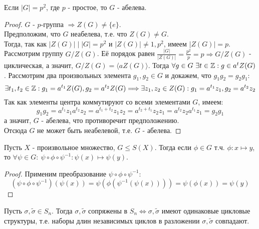 \begin{consequense}
    Если $|G| = p^2$, где $p$ - простое, то $G$ - абелева.
\end{consequense}
\begin{proof}
    $G$ - $p$-группа $\Longrightarrow Z(G) \neq \{e\}$.\\
    Предположим, что $G$ неабелева, т.е. что $Z(G) \neq G$. \\
    Тогда, так как $|Z(G)| \mid |G| = p^2$ и $|Z(G)| \neq 1, p^2$, имеем $|Z(G)| = p$.\\
    Рассмотрим группу $G / Z(G)$. Её порядок равен $\frac{|G|}{|Z(G)|} = \frac{p^2}{p} = p \Longrightarrow G / Z(G)$ - циклическая, а значит, $G / Z(G) = \langle aZ(G) \rangle$. Тогда $\forall g \in G \ \exists t \in \mathbb{Z}: g \in a^tZ(G)$. Рассмотрим два произвольных элемента $g_1, g_2 \in G$ и докажем, что $g_1g_2 = g_2g_1$:
    \[\exists t_1, t_2 \in \mathbb{Z}: g_1 = a^{t_1}Z(G), g_2 = a^{t_2}Z(G) \Longrightarrow \exists z_1, z_2 \in Z(G):  g_1 = a^{t_1}z_1, g_2 = a^{t_2}z_2\]
    Так как элементы центра коммутируют со всеми элементами $G$, имеем:
    \[g_1g_2 = a^{t_1}z_1a^{t_2}z_2 = a^{t_1 + t_2}z_1z_2 = a^{t_2 + t_1}z_2z_1 = a^{t_2}z_2a^{t_1}z_1 = g_2g_1\]
    а значит, $G$ - абелева, что противоречит предположению.\\
    Отсюда $G$ не может быть неабелевой, т.е. $G$ - абелева. 
\end{proof}
\begin{lemmanum}
    Пусть $X$ - произвольное множество, $G \leq S(X)$. Тогда если $\phi \in G$ т.ч. $\phi: x \mapsto y$, то $\forall \psi \in G: \ \psi \circ \phi \circ \psi^{-1}: \psi(x) \mapsto \psi(y)$.
\end{lemmanum}
\begin{proof}
    Применим преобразование $\psi \circ \phi \circ \psi^{-1}$:
    \[(\psi \circ \phi \circ \psi^{-1})(\psi(x)) = \psi (\phi (\psi^{-1}(\psi(x)))) = \psi(\phi(x)) = \psi(y)\]
\end{proof}
\begin{subtheoremnum}
    Пусть $\sigma, \tilde{\sigma} \in S_n$. Тогда $\sigma, \tilde{\sigma}$ сопряжены в $S_n \Longleftrightarrow \sigma, \tilde{\sigma}$ имеют одинаковые цикловые структуры, т.е. наборы длин независимых циклов в разложении $\sigma, \tilde{\sigma}$ совпадают.
\end{subtheoremnum}
